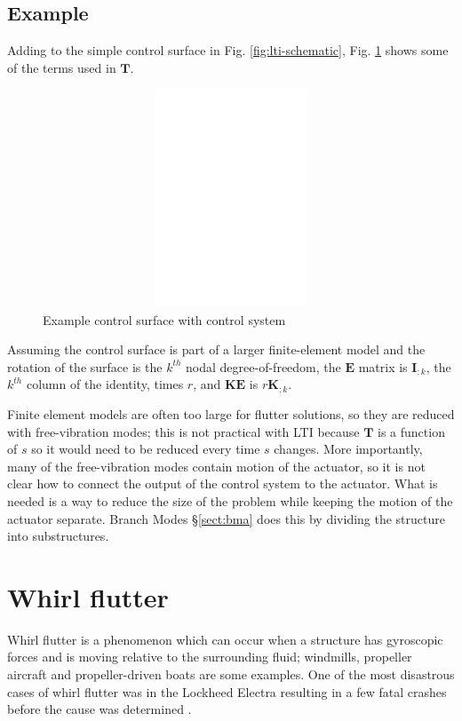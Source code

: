 \documentclass[11pt,openany,twoside]{book}
\numberwithin{equation}{section}		%
\newcommand{\Matrix}[1]{\boldsymbol{#1}}
\newcommand{\Vector}[1]{\boldsymbol{#1}}
\newcommand{\Sectref}[1]{\S\ref{#1}}
\newcommand{\Figref}[1]{Fig. \ref{#1}}  %
\begin{document}
\subsection{Example}
Adding to the simple control surface in \Figref{fig:lti-schematic},
\Figref{fig:lti-example} shows some of the terms used in $\Matrix{T}$.
\begin{figure}[ht]
		\includegraphics[height=6.5cm,width=12cm]{lti-example.eps}
	\centering
	\caption{Example control surface with control system}\label{fig:lti-example}
\end{figure}
Assuming the control surface is part of a larger finite-element model
and the rotation of the surface is the $k^{th}$ nodal degree-of-freedom,
the $\Matrix{E}$ matrix is $\Vector{I}_{:k}$, the  $k^{th}$ column of
the identity, times $r$, and $\Matrix{KE}$ is $r\Matrix{K}_{:k}$.

Finite element models are often too large for flutter solutions,
so they are reduced with free-vibration modes; this is not practical
with LTI because $\Matrix{T}$ is a function of $s$ so it would need
to be reduced every time $s$ changes.
More importantly, many of the free-vibration modes contain motion
of the actuator, so it is not clear how to connect the output of
the control system to the actuator. What is needed is a way to reduce
the size of the problem while keeping the motion of the actuator separate.
Branch Modes \Sectref{sect:bma} does this by dividing the structure
into substructures.

\newpage
\section{Whirl flutter}\label{sect:whirl-flutter}

Whirl flutter is a phenomenon which can occur when a structure has gyroscopic
forces and is moving relative to the surrounding fluid; windmills, propeller
aircraft and propeller-driven boats are some examples.
One of the most disastrous cases of whirl flutter was in the Lockheed
Electra resulting in a few fatal crashes before the cause was determined \cite{lockheedcrash}.
\end{document}
